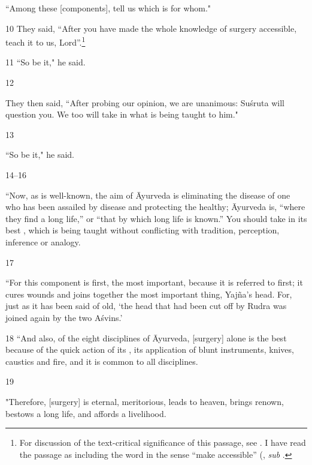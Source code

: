 \begin{translation}
     “Among these [components], tell us which is for whom."
    
    \item[10] They said,  “After you have made
the whole knowledge of surgery accessible, teach it to us,
Lord”.\footnote{For discussion of the text-critical significance
    of this passage, see \cite{hari-2013}. I have read the passage as including 
    the word  in the sense “make accessible” 
    (\cite[cf.][94]{moni-sans}, \emph{sub} .}
    
    \item[11]  “So be it," he said.
    
    \item[12] 
    
They then said,  “After probing our opinion, we are unanimous: Suśruta
will question you. We too will take in what is being taught to him."
    
 \item[13] 
 
“So be it," he said.
    
    \item[14--16] 

“Now, as is well-known, the aim of Āyurveda is eliminating the
disease of one who has been assailed by disease and protecting the
healthy; Āyurveda is, “where they find a long life,” or “that by
which long life is known.” You should take in its best
, which is being taught without conflicting with
tradition, perception, inference or analogy.
    
    \item[17] 
    
“For this component is first, the most important, because it is 
    referred to first; it cures wounds and joins together the most important thing, 
    Yajña's head. For, just as it has been said of old, `the head that had been cut 
    off by Rudra was joined again by the two Aśvins.'
    
    \item[18] 
“And also, of the eight disciplines of Āyurveda, [surgery]
alone is the best because of the quick action of its
, its application of blunt instruments, knives,
caustics and fire, and it is common to all disciplines.
    
    \item[19] 
    
"Therefore, [surgery] is eternal, meritorious, leads to heaven,
brings renown, bestows a long life, and affords a livelihood.
    

\end{translation}
